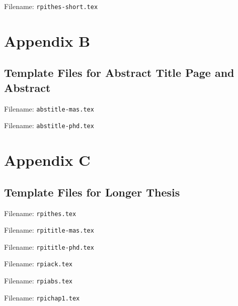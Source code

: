 \documentclass[letterpaper,11pt]{article}
\begin{document}
Filename: \verb|rpithes-short.tex|



\newpage

\section*{Appendix B}
\label{sec:appB}

\subsection*{Template Files for Abstract Title Page and Abstract}

Filename: \verb|abstitle-mas.tex|



Filename: \verb|abstitle-phd.tex|



\newpage

\section*{Appendix C}
\label{sec:appC}

\subsection*{Template Files for Longer Thesis}

Filename: \verb|rpithes.tex|



Filename: \verb|rpititle-mas.tex|



Filename: \verb|rpititle-phd.tex|



Filename: \verb|rpiack.tex|



Filename: \verb|rpiabs.tex|



Filename: \verb|rpichap1.tex|


\end{document}
